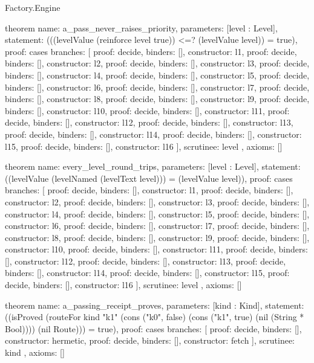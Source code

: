 \begin{lexlean}{Factory.Engine}
\begin{semanticmodule}
theorem{
  name: a_pass_never_raises_priority,
  parameters: [level : Level],
  statement: (((levelValue (reinforce level true)) <=? (levelValue level)) = true),
  proof: cases{
    branches: [
      {proof: decide{}, binders: [], constructor: l1},
      {proof: decide{}, binders: [], constructor: l2},
      {proof: decide{}, binders: [], constructor: l3},
      {proof: decide{}, binders: [], constructor: l4},
      {proof: decide{}, binders: [], constructor: l5},
      {proof: decide{}, binders: [], constructor: l6},
      {proof: decide{}, binders: [], constructor: l7},
      {proof: decide{}, binders: [], constructor: l8},
      {proof: decide{}, binders: [], constructor: l9},
      {proof: decide{}, binders: [], constructor: l10},
      {proof: decide{}, binders: [], constructor: l11},
      {proof: decide{}, binders: [], constructor: l12},
      {proof: decide{}, binders: [], constructor: l13},
      {proof: decide{}, binders: [], constructor: l14},
      {proof: decide{}, binders: [], constructor: l15},
      {proof: decide{}, binders: [], constructor: l16}
    ],
    scrutinee: level
  },
  axioms: []
}

theorem{
  name: every_level_round_trips,
  parameters: [level : Level],
  statement: ((levelValue (levelNamed (levelText level))) = (levelValue level)),
  proof: cases{
    branches: [
      {proof: decide{}, binders: [], constructor: l1},
      {proof: decide{}, binders: [], constructor: l2},
      {proof: decide{}, binders: [], constructor: l3},
      {proof: decide{}, binders: [], constructor: l4},
      {proof: decide{}, binders: [], constructor: l5},
      {proof: decide{}, binders: [], constructor: l6},
      {proof: decide{}, binders: [], constructor: l7},
      {proof: decide{}, binders: [], constructor: l8},
      {proof: decide{}, binders: [], constructor: l9},
      {proof: decide{}, binders: [], constructor: l10},
      {proof: decide{}, binders: [], constructor: l11},
      {proof: decide{}, binders: [], constructor: l12},
      {proof: decide{}, binders: [], constructor: l13},
      {proof: decide{}, binders: [], constructor: l14},
      {proof: decide{}, binders: [], constructor: l15},
      {proof: decide{}, binders: [], constructor: l16}
    ],
    scrutinee: level
  },
  axioms: []
}

theorem{
  name: a_passing_receipt_proves,
  parameters: [kind : Kind],
  statement: ((isProved (routeFor kind "k1" (cons ("k0", false) (cons ("k1", true) (nil (String * Bool)))) (nil Route))) = true),
  proof: cases{
    branches: [
      {proof: decide{}, binders: [], constructor: hermetic},
      {proof: decide{}, binders: [], constructor: fetch}
    ],
    scrutinee: kind
  },
  axioms: []
}


\end{semanticmodule}
\end{lexlean}

